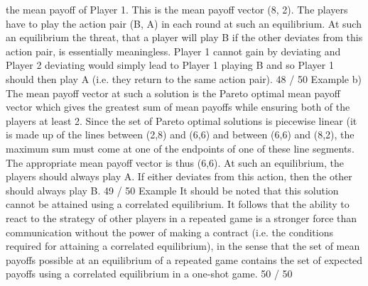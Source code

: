 the mean payoff of Player 1.
This is the mean payoff vector (8, 2). The players have to play the
action pair (B, A) in each round at such an equilibrium.
At such an equilibrium the threat, that a player will play B if the
other deviates from this action pair, is essentially meaningless.
Player 1 cannot gain by deviating and Player 2 deviating would
simply lead to Player 1 playing B and so Player 1 should then play
A (i.e. they return to the same action pair).
48 / 50
Example
b) The mean payoff vector at such a solution is the Pareto optimal
mean payoff vector which gives the greatest sum of mean payoffs
while ensuring both of the players at least 2.
Since the set of Pareto optimal solutions is piecewise linear (it is
made up of the lines between (2,8) and (6,6) and between (6,6)
and (8,2), the maximum sum must come at one of the endpoints
of one of these line segments.
The appropriate mean payoff vector is thus (6,6). At such an
equilibrium, the players should always play A. If either deviates
from this action, then the other should always play B.
49 / 50
Example
It should be noted that this solution cannot be attained using a
correlated equilibrium.
It follows that the ability to react to the strategy of other players
in a repeated game is a stronger force than communication
without the power of making a contract (i.e. the conditions
required for attaining a correlated equilibrium), in the sense that
the set of mean payoffs possible at an equilibrium of a repeated
game contains the set of expected payoffs using a correlated
equilibrium in a one-shot game.
50 / 50
